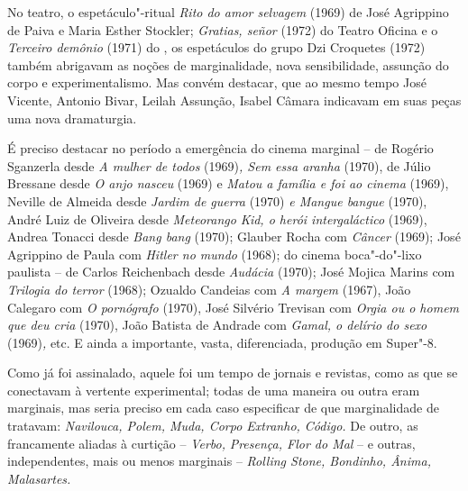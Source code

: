No teatro, o espetáculo"-ritual \emph{Rito do amor selvagem} (1969) de
José Agrippino de Paiva e Maria Esther Stockler; \emph{Gratias, señor}
(1972) do Teatro Oficina e o \emph{Terceiro demônio} (1971) do , os
espetáculos do grupo Dzi Croquetes (1972) também abrigavam as noções de
marginalidade, nova sensibilidade, assunção do corpo e experimentalismo.
Mas convém destacar, que ao mesmo tempo José Vicente, Antonio Bivar,
Leilah Assunção, Isabel Câmara indicavam em suas peças uma nova
dramaturgia.

É preciso destacar no período a emergência do cinema marginal -- de
Rogério Sganzerla desde \emph{A mulher de todos} (1969)\emph{, Sem essa
aranha} (1970), de Júlio Bressane desde \emph{O anjo nasceu} (1969) e
\emph{Matou a família e foi ao cinema} (1969), Neville de Almeida desde
\emph{Jardim de guerra} (1970) \emph{e Mangue bangue} (1970), André Luiz
de Oliveira desde \emph{Meteorango Kid, o herói intergaláctico} (1969),
Andrea Tonacci desde \emph{Bang bang} (1970); Glauber Rocha com
\emph{Câncer} (1969); José Agrippino de Paula com \emph{Hitler no 
mundo} (1968); do cinema boca"-do"-lixo paulista -- de Carlos Reichenbach
desde \emph{Audácia} (1970); José Mojica Marins com \emph{Trilogia do
terror} (1968); Ozualdo Candeias com \emph{A margem} (1967), João
Calegaro com \emph{O pornógrafo} (1970), José Silvério Trevisan com
\emph{Orgia ou o homem que deu cria} (1970), João Batista de Andrade com
\emph{Gamal, o delírio do sexo} (1969)\emph{,} etc. E ainda a
importante, vasta, diferenciada, produção em Super"-8.

Como já foi assinalado, aquele foi um tempo de jornais e revistas, como
as que se conectavam à vertente experimental; todas de uma maneira ou
outra eram marginais, mas seria preciso em cada caso especificar de que
marginalidade de tratavam: \emph{Navilouca, Polem, Muda, Corpo Extranho,
Código.} De outro, as francamente aliadas à curtição -- \emph{Verbo,}
\emph{Presença, Flor do Mal} -- e outras, independentes, mais ou menos
marginais -- \emph{Rolling Stone, Bondinho, Ânima, Malasartes.}

